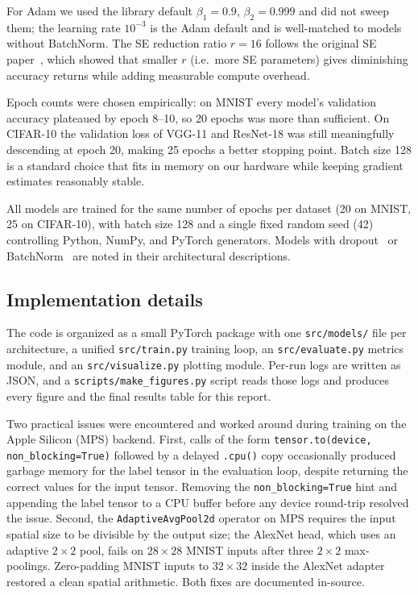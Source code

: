 \documentclass[conference,10pt]{IEEEtran}
\begin{document}
For Adam we used the library default $\beta_1\!=\!0.9$,
$\beta_2\!=\!0.999$ and did not sweep them; the learning rate
$10^{-3}$ is the Adam default and is well-matched to models without
BatchNorm. The SE reduction ratio $r\!=\!16$ follows the original
SE paper~\cite{hu2018squeeze}, which showed that smaller $r$
(i.e.\ more SE parameters) gives diminishing accuracy returns while
adding measurable compute overhead.

Epoch counts were chosen empirically: on MNIST every model's
validation accuracy plateaued by epoch 8--10, so 20 epochs was
more than sufficient. On CIFAR-10 the validation loss of VGG-11 and
ResNet-18 was still meaningfully descending at epoch 20, making 25
epochs a better stopping point. Batch size 128 is a standard choice
that fits in memory on our hardware while keeping gradient estimates
reasonably stable.

\noindent All models are trained for the same number of epochs per
dataset (20 on MNIST, 25 on CIFAR-10), with batch size 128 and a
single fixed random seed (42) controlling Python, NumPy, and PyTorch
generators. Models with dropout~\cite{srivastava2014dropout} or
BatchNorm~\cite{ioffe2015batch} are noted in their architectural
descriptions.

\subsection{Implementation details}

The code is organized as a small PyTorch package with one
\verb|src/models/| file per architecture, a unified
\verb|src/train.py| training loop, an \verb|src/evaluate.py| metrics
module, and an \verb|src/visualize.py| plotting module. Per-run logs
are written as JSON, and a \verb|scripts/make_figures.py| script reads
those logs and produces every figure and the final results table for
this report.

Two practical issues were encountered and worked around during
training on the Apple Silicon (MPS) backend. First, calls of the form
\verb|tensor.to(device, non_blocking=True)| followed by a delayed
\verb|.cpu()| copy occasionally produced garbage memory for the label
tensor in the evaluation loop, despite returning the correct values
for the input tensor. Removing the \verb|non_blocking=True| hint and
appending the label tensor to a CPU buffer before any device round-trip
resolved the issue. Second, the
\verb|AdaptiveAvgPool2d| operator on MPS requires the input spatial
size to be divisible by the output size; the AlexNet head, which uses
an adaptive $2\!\times\!2$ pool, fails on $28\!\times\!28$ MNIST inputs
after three $2\!\times\!2$ max-poolings. Zero-padding MNIST inputs to
$32\!\times\!32$ inside the AlexNet adapter restored a clean spatial
arithmetic. Both fixes are documented in-source.
\end{document}

